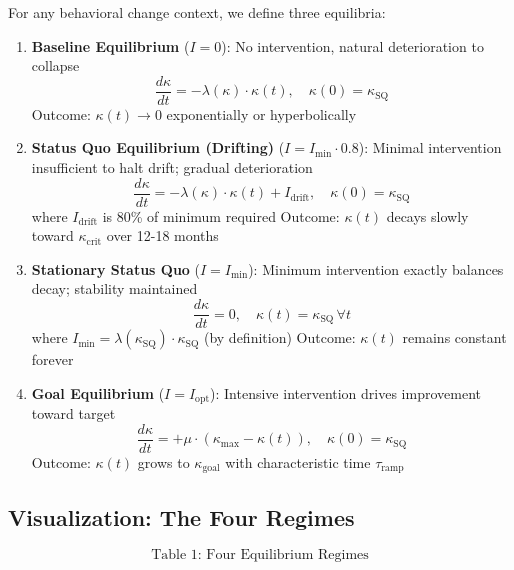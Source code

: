 \documentclass[11pt, a4paper]{article}
\begin{document}
\begin{definition}
For any behavioral change context, we define three equilibria:

\begin{enumerate}
    \item \textbf{Baseline Equilibrium} ($I = 0$):
    No intervention, natural deterioration to collapse
    $$\frac{d\kappa}{dt} = -\lambda(\kappa) \cdot \kappa(t), \quad \kappa(0) = \kappa_{\text{SQ}}$$
    Outcome: $\kappa(t) \to 0$ exponentially or hyperbolically

    \item \textbf{Status Quo Equilibrium (Drifting)} ($I = I_{\text{min}} \cdot 0.8$):
    Minimal intervention insufficient to halt drift; gradual deterioration
    $$\frac{d\kappa}{dt} = -\lambda(\kappa) \cdot \kappa(t) + I_{\text{drift}}, \quad \kappa(0) = \kappa_{\text{SQ}}$$
    where $I_{\text{drift}}$ is 80\% of minimum required
    Outcome: $\kappa(t)$ decays slowly toward $\kappa_{\text{crit}}$ over 12-18 months

    \item \textbf{Stationary Status Quo} ($I = I_{\text{min}}$):
    Minimum intervention exactly balances decay; stability maintained
    $$\frac{d\kappa}{dt} = 0, \quad \kappa(t) = \kappa_{\text{SQ}} \, \forall t$$
    where $I_{\text{min}} = \lambda(\kappa_{\text{SQ}}) \cdot \kappa_{\text{SQ}}$ (by definition)
    Outcome: $\kappa(t)$ remains constant forever

    \item \textbf{Goal Equilibrium} ($I = I_{\text{opt}}$):
    Intensive intervention drives improvement toward target
    $$\frac{d\kappa}{dt} = +\mu \cdot (\kappa_{\text{max}} - \kappa(t)), \quad \kappa(0) = \kappa_{\text{SQ}}$$
    Outcome: $\kappa(t)$ grows to $\kappa_{\text{goal}}$ with characteristic time $\tau_{\text{ramp}}$
\end{enumerate}
\end{definition}

\subsection{Visualization: The Four Regimes}

\begin{equation}
\text{Table 1: Four Equilibrium Regimes}
\end{equation}
\end{document}

